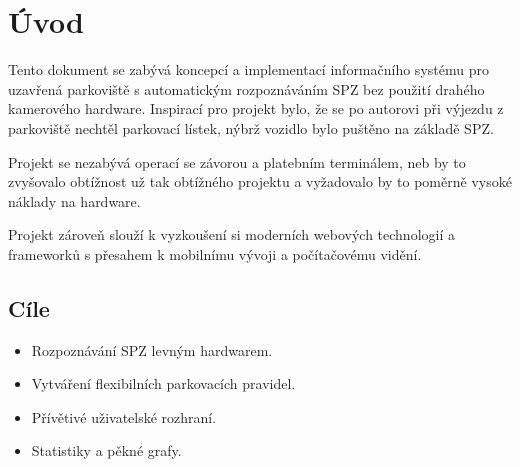 \chapter{Úvod} \label{uvod}

\noindent
Tento dokument se zabývá koncepcí a implementací informačního systému pro uzavřená
parkoviště s automatickým rozpoznáváním SPZ bez použití drahého kamerového hardware.
Inspirací pro projekt bylo, že se po autorovi při výjezdu z parkoviště nechtěl
parkovací lístek, nýbrž vozidlo bylo puštěno na základě SPZ.

Projekt se nezabývá operací se závorou a platebním terminálem, neb by to zvyšovalo
obtížnost už tak obtížného projektu a vyžadovalo by to poměrně vysoké
náklady na hardware.

Projekt zároveň slouží k vyzkoušení si moderních webových technologií
a frameworků s přesahem k mobilnímu vývoji a počítačovému vidění.

\section*{Cíle}

\begin{itemize}
  \setlength\itemsep{0.05em}
  \item Rozpoznávání SPZ levným hardwarem.
  \item Vytváření flexibilních parkovacích pravidel.
  \item Přívětivé uživatelské rozhraní.
  \item Statistiky a pěkné grafy.
\end{itemize}


